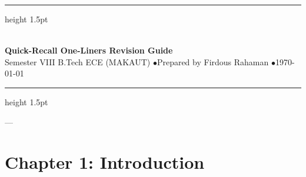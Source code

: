 \documentclass[11pt,a4paper]{article}
\begin{document}
\begin{center}
  \vspace*{-0.3in}
  {\hrule height 1.5pt} \vspace{0.25cm}
  {\Huge\bfseries\color{darkblue}} \\[0.2cm]
  {\Large\bfseries\color{secondary}\sffamily Quick-Recall One-Liners Revision Guide} \\[0.25cm]
  {\small\sffamily\color{secondary} Semester VIII B.Tech ECE (MAKAUT) \quad$\bullet$\quad Prepared by Firdous Rahaman \quad$\bullet$\quad \today} \\[0.2cm]
  {\hrule height 1.5pt}
  \vspace{1.0em}
\end{center}
\thispagestyle{plain}


---

\section*{Chapter 1: Introduction}
\end{document}
